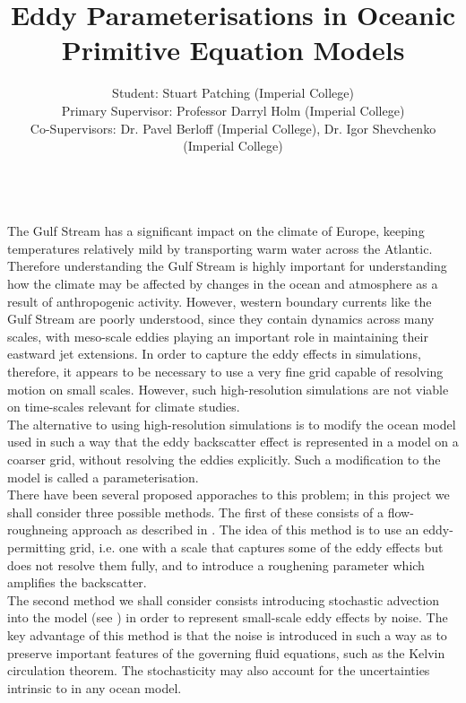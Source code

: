 \documentclass[11pt]{article}
\begin{document}
\title{\vspace{-4.0em}Eddy Parameterisations in Oceanic Primitive Equation Models}
\date{\vspace{-0.5em}}
\author{Student: Stuart Patching (Imperial College)\\
\small{Primary Supervisor: Professor Darryl Holm (Imperial College)}\\
\small{Co-Supervisors: Dr. Pavel Berloff (Imperial College), Dr. Igor Shevchenko (Imperial College)} \vspace{-2em}}
\maketitle
\textbf{ }\\
		The Gulf Stream has a significant impact on the climate of Europe, keeping temperatures relatively mild by transporting warm water across the Atlantic. Therefore understanding the Gulf Stream is highly important for understanding how the climate may be affected by changes in the ocean and atmosphere as a result of anthropogenic activity. However, western boundary currents like the Gulf Stream are poorly understood, since they contain dynamics across many scales, with meso-scale eddies playing an important role in maintaining their eastward jet extensions. In order to capture the eddy effects in simulations, therefore, it appears to be necessary to use a very fine grid capable of resolving motion on small scales. However, such high-resolution simulations are not viable on time-scales relevant for climate studies. \\
		\indnt The alternative to using high-resolution simulations is to modify the ocean model used in such a way that the eddy backscatter effect is represented in a model on a coarser grid, without resolving the eddies explicitly. Such a modification to the model is called a parameterisation. \\
		\linebreak
		There have been several proposed apporaches to this problem; in this project we shall consider three possible methods. The first of these consists of a flow-roughneing approach as described in \cite{i}. The idea of this method is to use an eddy-permitting grid, i.e. one with a scale that captures some of the eddy effects but does not resolve them fully, and to introduce a roughening parameter which amplifies the backscatter. \\
		\indnt The second method we shall consider consists introducing stochastic advection into the model (see \cite{ii}) in order to represent small-scale eddy effects by noise. The key advantage of this method is that the noise is introduced in such a way as to preserve important features of the governing fluid equations, such as the Kelvin circulation theorem. The stochasticity may also account for the uncertainties intrinsic to in any ocean model. \\
\end{document}
